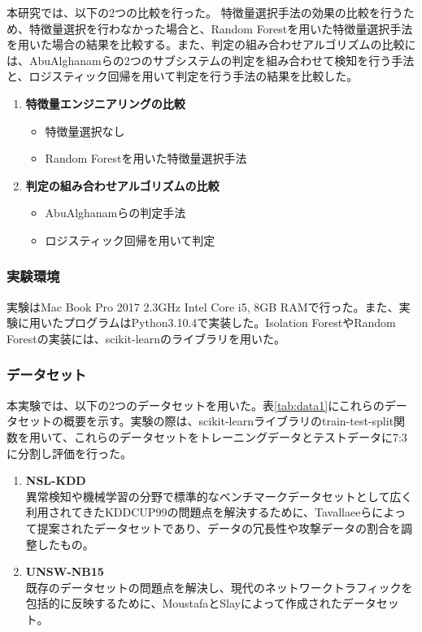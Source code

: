 \documentclass{css}
\begin{document}
本研究では、以下の2つの比較を行った。
特徴量選択手法の効果の比較を行うため、特徴量選択を行わなかった場合と、Random Forestを用いた特徴量選択手法を用いた場合の結果を比較する。また、判定の組み合わせアルゴリズムの比較には、AbuAlghanamらの2つのサブシステムの判定を組み合わせて検知を行う手法\cite{AbuAlghanam2023-sx}と、ロジスティック回帰を用いて判定を行う手法の結果を比較した。

\begin{enumerate}
    \item \textbf{特徴量エンジニアリングの比較}
        \begin{itemize}
            \item 特徴量選択なし
            \item Random Forestを用いた特徴量選択手法
        \end{itemize}
    \item \textbf{判定の組み合わせアルゴリズムの比較}
        \begin{itemize}
            \item AbuAlghanamらの判定手法\cite{AbuAlghanam2023-sx}
            \item ロジスティック回帰を用いて判定
        \end{itemize}
\end{enumerate}

\subsubsection{実験環境}

実験はMac Book Pro 2017 2.3GHz Intel Core i5, 8GB RAMで行った。また、実験に用いたプログラムはPython3.10.4で実装した。Isolation ForestやRandom Forestの実装には、scikit-learnのライブラリを用いた\cite{scikit-learn}。

\subsubsection{データセット}
本実験では、以下の2つのデータセットを用いた。表\ref{tab:data1}にこれらのデータセットの概要を示す。実験の際は、scikit-learnライブラリのtrain-test-split関数を用いて、これらのデータセットをトレーニングデータとテストデータに7:3に分割し評価を行った。

\begin{enumerate}
    \item \textbf{NSL-KDD}\\
        異常検知や機械学習の分野で標準的なベンチマークデータセットとして広く利用されてきたKDDCUP99\cite{KDDCUP99}の問題点を解決するために、Tavallaeeらによって提案されたデータセットであり、データの冗長性や攻撃データの割合を調整したもの\cite{Tavallaee2009-we}。
    \item \textbf{UNSW-NB15}\\
        既存のデータセットの問題点を解決し、現代のネットワークトラフィックを包括的に反映するために、MoustafaとSlayによって作成されたデータセット\cite{Moustafa2015-cg}。
\end{enumerate}
\end{document}
